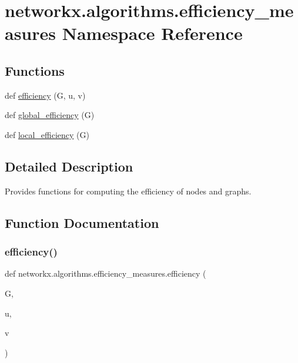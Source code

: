 \hypertarget{namespacenetworkx_1_1algorithms_1_1efficiency__measures}{}\section{networkx.\+algorithms.\+efficiency\+\_\+measures Namespace Reference}
\label{namespacenetworkx_1_1algorithms_1_1efficiency__measures}
\subsection*{Functions}
\begin{DoxyCompactItemize}
\item 
def \hyperlink{namespacenetworkx_1_1algorithms_1_1efficiency__measures_a1807807c931a1db6b41ca57f0e8cd0f1}{efficiency} (G, u, v)
\item 
def \hyperlink{namespacenetworkx_1_1algorithms_1_1efficiency__measures_a25868f63960e002d393a52de5ed6dc5a}{global\+\_\+efficiency} (G)
\item 
def \hyperlink{namespacenetworkx_1_1algorithms_1_1efficiency__measures_a5b866c32c97ea0ac623533ebcc4949b5}{local\+\_\+efficiency} (G)
\end{DoxyCompactItemize}


\subsection{Detailed Description}
\begin{DoxyVerb}Provides functions for computing the efficiency of nodes and graphs.\end{DoxyVerb}
 

\subsection{Function Documentation}
\mbox{\label{namespacenetworkx_1_1algorithms_1_1efficiency__measures_a1807807c931a1db6b41ca57f0e8cd0f1}} 
\subsubsection{\texorpdfstring{efficiency()}{efficiency()}}
{\footnotesize\ttfamily def networkx.\+algorithms.\+efficiency\+\_\+measures.\+efficiency (\begin{DoxyParamCaption}\item[{}]{G,  }\item[{}]{u,  }\item[{}]{v }\end{DoxyParamCaption})}

